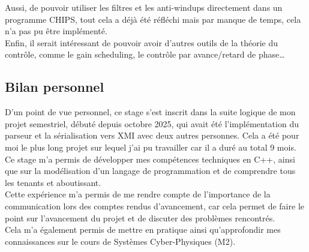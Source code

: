Aussi, de pouvoir utiliser les filtres et les anti-windups directement dans un programme CHIPS, tout cela a déjà été réfléchi mais par manque de temps, cela n'a pas pu être implémenté. \\

Enfin, il serait intéressant de pouvoir avoir d'autres outils de la théorie du contrôle, comme le gain scheduling, le contrôle par avance/retard de phase\dots


\newpage

\subsection{Bilan personnel}
\label{sec:bilan_personnel}

D'un point de vue personnel, ce stage s'est inscrit dans la suite logique de mon projet semestriel, débuté depuis 
octobre 2025, qui avait été l'implémentation du parseur et la sérialisation vers XMI avec deux autres personnes. 
Cela a été pour moi le plus long projet sur lequel j'ai pu travailler car il a duré au total 9 mois. \\

Ce stage m'a permis de développer mes compétences techniques en C++, ainsi que sur la modélisation d'un langage de 
programmation et de comprendre tous les tenants et aboutissant. \\

Cette expérience m'a permis de me rendre compte de l'importance de la communication lors des comptes rendus 
d'avancement, car cela permet de faire le point sur l'avancement du projet et de discuter des problèmes 
rencontrés. \\

Cela m'a également permis de mettre en pratique ainsi qu'approfondir mes connaissances sur le cours de Systèmes Cyber-Physiques (M2). \\ 

\FloatBarrier

\newpage